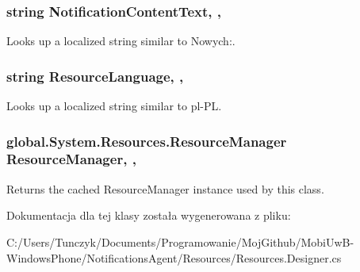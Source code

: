 \subsubsection[{Notification\+Content\+Text}]{\setlength{\rightskip}{0pt plus 5cm}string Notification\+Content\+Text\hspace{0.3cm}{\ttfamily [static]}, {\ttfamily [get]}, {\ttfamily [package]}}\label{a00047_a142c14840c9a6d87d6bfa9f117309251}


Looks up a localized string similar to Nowych\+:. 

\hypertarget{a00047_ad8b77c808c48786b35febc21f8754920}{}
\subsubsection[{Resource\+Language}]{\setlength{\rightskip}{0pt plus 5cm}string Resource\+Language\hspace{0.3cm}{\ttfamily [static]}, {\ttfamily [get]}, {\ttfamily [package]}}\label{a00047_ad8b77c808c48786b35febc21f8754920}


Looks up a localized string similar to pl-\/\+P\+L. 

\hypertarget{a00047_a0facd9f93017f922ba97bef37fd95b1d}{}
\subsubsection[{Resource\+Manager}]{\setlength{\rightskip}{0pt plus 5cm}global.\+System.\+Resources.\+Resource\+Manager Resource\+Manager\hspace{0.3cm}{\ttfamily [static]}, {\ttfamily [get]}, {\ttfamily [package]}}\label{a00047_a0facd9f93017f922ba97bef37fd95b1d}


Returns the cached Resource\+Manager instance used by this class. 



Dokumentacja dla tej klasy została wygenerowana z pliku\+:\begin{DoxyCompactItemize}
\item 
C\+:/\+Users/\+Tunczyk/\+Documents/\+Programowanie/\+Moj\+Github/\+Mobi\+Uw\+B-\/\+Windows\+Phone/\+Notifications\+Agent/\+Resources/Resources.\+Designer.\+cs\end{DoxyCompactItemize}
